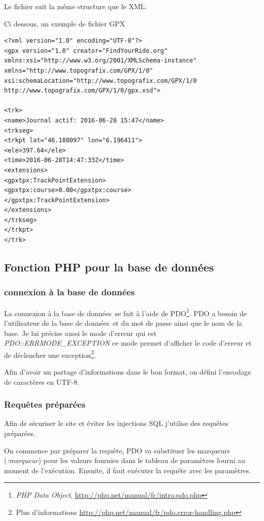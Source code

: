 \documentclass[a4paper]{article}
\newcommand{\bdd}{base de données}
\begin{document}
Le fichier suit la même structure que le XML.

Ci dessous, un exemple de fichier GPX

\begin{lstlisting}[frame=single] 
<?xml version="1.0" encoding="UTF-8"?>
<gpx version="1.0" creator="FindYourRide.org" xmlns:xsi="http://www.w3.org/2001/XMLSchema-instance" xmlns="http://www.topografix.com/GPX/1/0" xsi:schemaLocation="http://www.topografix.com/GPX/1/0 http://www.topografix.com/GPX/1/0/gpx.xsd">

<trk>
<name>Journal actif: 2016-06-28 15:47</name>
<trkseg>
<trkpt lat="46.188097" lon="6.196411">
<ele>397.64</ele>
<time>2016-06-28T14:47:33Z</time>
<extensions>
<gpxtpx:TrackPointExtension>
<gpxtpx:course>0.00</gpxtpx:course>
</gpxtpx:TrackPointExtension>
</extensions>
</trkseg>
</trkpt>
</trk>

\end{lstlisting}


\subsection{Fonction PHP pour la \bdd}
\subsubsection{connexion à la \bdd}
La connexion à la \bdd \ se fait à l'aide de PDO\footnote{\emph{PHP Data Object}, \url{http://php.net/manual/fr/intro.pdo.php}}. PDO a besoin de l'utilisateur de la \bdd \  et du mot de passe ainsi que le nom de la base.
Je lui précise aussi le mode d'erreur qui est \emph{PDO::ERRMODE\_EXCEPTION} ce mode permet d'afficher le code d'erreur et de déclencher une exception\footnote{Plus d'informations \url{http://php.net/manual/fr/pdo.error-handling.php}}.

Afin d'avoir un partage d'informations dans le bon format, on défini l'encodage de caractères en UTF-8.

\subsubsection{Requêtes préparées}
Afin de sécuriser le site et éviter les injections SQL j'utilise des requêtes préparées.

On commence par préparer la requête, PDO va substituer les marqueurs (\emph{:marqueur}) pour les valeurs fournies dans le tableau de paramètres fourni au moment de l'exécution. Ensuite, il faut exécuter la requête avec les paramètres.
\end{document}
